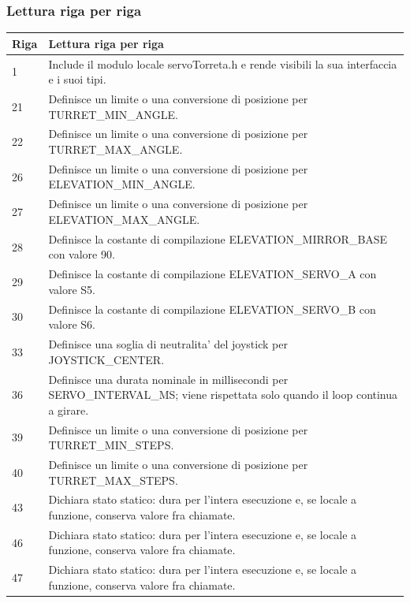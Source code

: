 \documentclass[11pt,a4paper]{article}
\begin{document}
\subsubsection{Lettura riga per riga}
\begin{longtable}{p{}p{}}
\toprule
\textbf{Riga} & \textbf{Lettura riga per riga} \\
\midrule
\endhead
1 & Include il modulo locale servoTorreta.h e rende visibili la sua interfaccia e i suoi tipi. \\
21 & Definisce un limite o una conversione di posizione per TURRET\_\allowbreak{}MIN\_\allowbreak{}ANGLE. \\
22 & Definisce un limite o una conversione di posizione per TURRET\_\allowbreak{}MAX\_\allowbreak{}ANGLE. \\
26 & Definisce un limite o una conversione di posizione per ELEVATION\_\allowbreak{}MIN\_\allowbreak{}ANGLE. \\
27 & Definisce un limite o una conversione di posizione per ELEVATION\_\allowbreak{}MAX\_\allowbreak{}ANGLE. \\
28 & Definisce la costante di compilazione ELEVATION\_\allowbreak{}MIRROR\_\allowbreak{}BASE con valore 90. \\
29 & Definisce la costante di compilazione ELEVATION\_\allowbreak{}SERVO\_\allowbreak{}A con valore S5. \\
30 & Definisce la costante di compilazione ELEVATION\_\allowbreak{}SERVO\_\allowbreak{}B con valore S6. \\
33 & Definisce una soglia di neutralita' del joystick per JOYSTICK\_\allowbreak{}CENTER. \\
36 & Definisce una durata nominale in millisecondi per SERVO\_\allowbreak{}INTERVAL\_\allowbreak{}MS; viene rispettata solo quando il loop continua a girare. \\
39 & Definisce un limite o una conversione di posizione per TURRET\_\allowbreak{}MIN\_\allowbreak{}STEPS. \\
40 & Definisce un limite o una conversione di posizione per TURRET\_\allowbreak{}MAX\_\allowbreak{}STEPS. \\
43 & Dichiara stato statico: dura per l'intera esecuzione e, se locale a funzione, conserva valore fra chiamate. \\
46 & Dichiara stato statico: dura per l'intera esecuzione e, se locale a funzione, conserva valore fra chiamate. \\
47 & Dichiara stato statico: dura per l'intera esecuzione e, se locale a funzione, conserva valore fra chiamate. \\

\end{longtable}
\end{document}
